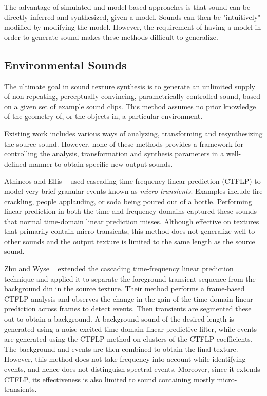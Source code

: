 \documentclass{acmsiggraph}               %
\begin{document}
The advantage of simulated and model-based approaches is that sound can be
directly inferred and synthesized, given a model.  Sounds can then be 
"intuitively" modified by modifying the model. However, the requirement 
of having a model in order to generate sound  makes these methods 
difficult to generalize.


\subsection{Environmental Sounds}

The ultimate goal in sound texture synthesis is to generate an unlimited 
supply of non-repeating, perceptually convincing, parametrically 
controlled sound, based on a given set of example sound clips. This 
method assumes no prior knowledge of the geometry of, or the objects in, 
a particular environment.

Existing work includes various ways of analyzing, transforming and 
resynthesizing the source sound. However, none of these methods provides 
a framework for controlling the analysis, transformation and synthesis 
parameters in a well-defined manner to obtain specific new output sounds.

Athineos and Ellis ~ used cascading time-frequency 
linear prediction (CTFLP) to model very brief granular events known as 
\textit{micro-transients}. Examples include fire crackling, people 
applauding, or soda being poured out of a bottle. Performing linear 
prediction in both the time and frequency domains captured these sounds 
that normal time-domain linear prediction misses.
Although effective on textures that primarily contain micro-transients, 
this method does not generalize well to other sounds and the output 
texture is limited to the same length as the source sound.

Zhu and Wyse ~ extended the cascading time-frequency 
linear prediction technique and applied it to separate the foreground 
transient sequence from the background din in the source texture. Their 
method performs a frame-based CTFLP analysis and observes the change in 
the gain of the time-domain linear prediction across frames to detect 
events. Then transients are segmented these out to obtain a background. 
A background sound of the desired length is generated using a noise 
excited time-domain linear predictive filter, while events are generated 
using the CTFLP method on clusters of the CTFLP coefficients. The 
background and events are then combined to obtain the final texture. 
However, this method does not take frequency into account while 
identifying events, and hence does not distinguish spectral events. 
Moreover, since it extends CTFLP, its effectiveness is also limited to 
sound containing mostly micro-transients.
\end{document}
